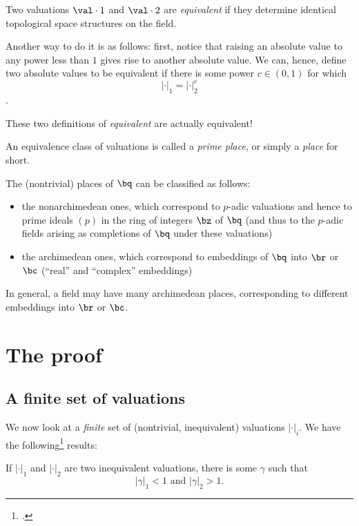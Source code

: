 \begin{defn}
  Two valuations $\val \cdot 1$ and $\val\cdot2$ are \textit{equivalent} if
  they determine identical topological space structures on the field.
\end{defn}

Another way to do it is as follows: first, notice that raising an absolute value
to any power less than $1$ gives rise to another absolute value. We can, hence,
define two absolute values to be equivalent if there is some power $c\in(0,1)$
for which \[|\cdot|_1 = |\cdot|_2^c\].

These two definitions of \textit{equivalent} are actually equivalent!

\begin{defn}
  An equivalence class of valuations is called a \textit{prime place}, or simply
  a \textit{place} for short.
\end{defn}

The (nontrivial) places of $\bq$ can be classified as follows:

\begin{itemize}
\item the nonarchimedean ones, which correspond to $p$-adic valuations and hence
  to prime ideals $(p)$ in the ring of integers $\bz$ of $\bq$ (and thus to the
  $p$-adic fields arising as completions of $\bq$ under these valuations)
\item the archimedean ones, which correspond to embeddings of $\bq$ into $\br$
  or $\bc$ (``real'' and ``complex'' embeddings)
\end{itemize}

In general, a field may have many archimedean places, corresponding to different
embeddings into $\br$ or $\bc$.

\section{The proof}
\subsection{A finite set of valuations}
\label{sec:orgheadline3}

We now look at a \textit{finite} set of (nontrivial, inequivalent) valuations
$|\cdot|_i$. We have the following\footcite[p. 471--2]{artinwhaples} results:

\begin{lemma}
  If \(|\cdot|_1\) and \(|\cdot|_2\) are two inequivalent valuations, there is
  some \(\gamma\) such that \[|\gamma|_1 < 1 \text{ and } |\gamma|_2 > 1.\]
\end{lemma}

